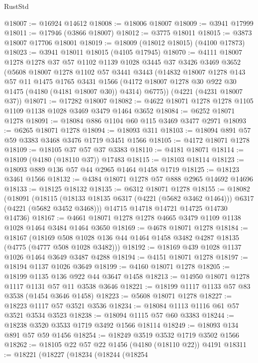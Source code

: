 \begin{lexlean}{RustStd}
\begin{coremodule}
@18007 := @16924 @14612
@18008 := @18006 @18007
@18009 := @3941 @17999
@18011 := @17946 (@3866 @18007)
@18012 := @3775 @18011
@18015 := @3873 @18007 @17706 @18001
@18019 := @18009 (@18012 @18015) (@4100 @17873)
@18023 := @3941 @18011 @18015 (@4105 @17945)
@18070 := @4111
    @18007
    @1278
    @1278
    @37
    @57
    @1102
    @1139
    @1028
    @3445
    @37
    @3426
    @3469
    @3652
    (@5608
      @18007
      @1278
      @1102
      @57
      @3441
      @3443
      (@14832
        @18007
        @1278
        @143
        @57
        @11
        @1475
        @1765
        @3431
        @1566
        (@4172 @18007 @1278 @30 @922 @30 @1475 (@4180 (@4181 @18007 @30)) @4314)
        @6775))
    (@4221 (@4231 @18007 @37))
@18071 := @17282 @18007
@18082 := @4622 @18071 @1278 @1278 @1105 @1109 @1138 @1028 @3469 @3479 @1464 @3652
@18084 := @6252 @18071 @1278
@18091 := @18084 @886 @1104 @60 @115 @3469 @3477 @2971
@18093 := @6265 @18071 @1278
@18094 := @18093 @311
@18103 := @18094 @891 @57 @59 @3383 @3468 @3476 @1719 @3451 @1566
@18105 := @4172 @18071 @1278
@18109 := @18105 @37 @57 @37 @3383
@18110 := @4181 @18071
@18114 := @18109 (@4180 (@18110 @37)) @17483
@18115 := @18103 @18114
@18123 := @18093 @889 @136 @57 @44 @2965 @1464 @1458 @1719
@18125 := @18123 @3461 @1566
@18132 := @4384 @18071 @1278 @57 @888 @2965 @14692 @14696
@18133 := @18125 @18132
@18135 := @6312 @18071 @1278
@18155 := @18082
    (@18091
      (@18115 (@18133 @18135 @6317 (@4221 (@5682 @3462 @1464))) @6317 (@4221 (@5682 @3452 @3468)))
      @14715
      @14718
      @14721
      @14725
      @14730
      @14736)
@18167 := @4661 @18071 @1278 @1278 @4665 @3479 @1109 @1138 @1028 @1464 @3484 @1464 @3650
@18169 := @4678 @18071 @1278
@18184 := @18167
    (@18169 @508 @1028 @136 @44 @1464 @1458 @3482 @4287 @18135 (@4775 (@4777 @508 @1028 @3482)))
@18192 := @18169 @439 @1028 @1137 @1026 @1464 @3649 @3487 @4288
@18194 := @4151 @18071 @1278
@18197 := @18194 @1137 @1026 @3649
@18199 := @4160 @18071 @1278
@18205 := @18199 @1135 @136 @922 @44 @3647 @1458
@18213 := @14950 @18071 @1278 @1117 @1131 @57 @11 @3538 @3646
@18221 := @18199 @1117 @1133 @57 @83 @3538 (@1454 @3646 @1458)
@18223 := @5608 @18071 @1278
@18227 := @18223 @1117 @57 @3521 @3536
@18234 := @18084 @1113 @1116 @61 @57 @3521 @3534 @3523
@18238 := @18094 @1115 @57 @60 @3383
@18244 := @18238 @3520 @3533 @1719 @3492 @1566 @18114
@18249 := @18093 @134 @891 @57 @59 @1456
@18254 := @18249 @3519 @3532 @1719 @3502 @1566
@18262 := @18105 @22 @57 @22 @1456 (@4180 (@18110 @22)) @4191
@18311 := @18221
    (@18227
      (@18234
        (@18244
          (@18254

\end{coremodule}
\end{lexlean}
